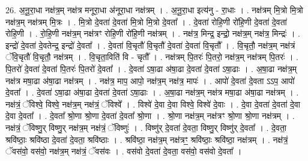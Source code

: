 \documentclass[17pt]{extarticle}
\begin{document}
26. अ॒नू॒रा॒धा नक्ष॑त्र॒म् नक्ष॑त्र मनूरा॒धा अ॑नूरा॒धा नक्ष॑त्रम् । . अ॒नू॒रा॒धा इत्य॑नु - रा॒धाः । . नक्ष॑त्रम् मि॒त्रो मि॒त्रो नक्ष॑त्र॒म् नक्ष॑त्रम् मि॒त्रः । . मि॒त्रो दे॒वता॑ दे॒वता॑ मि॒त्रो मि॒त्रो दे॒वता᳚ । . दे॒वता॑ रोहि॒णी रो॑हि॒णी दे॒वता॑ दे॒वता॑ रोहि॒णी । . रो॒हि॒णी नक्ष॑त्र॒म् नक्ष॑त्रꣳ रोहि॒णी रो॑हि॒णी नक्ष॑त्रम् । . नक्ष॑त्र॒ मिन्द्र॒ इन्द्रो॒ नक्ष॑त्र॒म् नक्ष॑त्र॒ मिन्द्रः॑ । . इन्द्रो॑ दे॒वता॑ दे॒वतेन्द्र॒ इन्द्रो॑ दे॒वता᳚ । . दे॒वता॑ वि॒चृतौ॑ वि॒चृतौ॑ दे॒वता॑ दे॒वता॑ वि॒चृतौ᳚ । . वि॒चृतौ॒ नक्ष॑त्र॒म् नक्ष॑त्रं ॅवि॒चृतौ॑ वि॒चृतौ॒ नक्ष॑त्रम् । . वि॒चृता॒विति॑ वि - चृतौ᳚ । . नक्ष॑त्रम् पि॒तरः॑ पि॒तरो॒ नक्ष॑त्र॒म् नक्ष॑त्रम् पि॒तरः॑ । . पि॒तरो॑ दे॒वता॑ दे॒वता॑ पि॒तरः॑ पि॒तरो॑ दे॒वता᳚ । . दे॒वता॑ ऽषा॒ढा अ॑षा॒ढा दे॒वता॑ दे॒वता॑ ऽषा॒ढाः । . अ॒षा॒ढा नक्ष॑त्र॒म् नक्ष॑त्र मषा॒ढा अ॑षा॒ढा नक्ष॑त्रम् । . नक्ष॑त्र॒ माप॒ आपो॒ नक्ष॑त्र॒म् नक्ष॑त्र॒ मापः॑ । . आपो॑ दे॒वता॑ दे॒वता ऽऽप॒ आपो॑ दे॒वता᳚ । . दे॒वता॑ ऽषा॒ढा अ॑षा॒ढा दे॒वता॑ दे॒वता॑ ऽषा॒ढाः । . अ॒षा॒ढा नक्ष॑त्र॒म् नक्ष॑त्र मषा॒ढा अ॑षा॒ढा नक्ष॑त्रम् । . नक्ष॑त्रं॒ ॅविश्वे॒ विश्वे॒ नक्ष॑त्र॒म् नक्ष॑त्रं॒ ॅविश्वे᳚ । . विश्वे॑ दे॒वा दे॒वा विश्वे॒ विश्वे॑ दे॒वाः । . दे॒वा दे॒वता॑ दे॒वता॑ दे॒वा दे॒वा दे॒वता᳚ । . दे॒वता᳚ श्रो॒णा श्रो॒णा दे॒वता॑ दे॒वता᳚ श्रो॒णा । . श्रो॒णा नक्ष॑त्र॒म् नक्ष॑त्रꣳ श्रो॒णा श्रो॒णा नक्ष॑त्रम् । . नक्ष॑त्रं॒ ॅविष्णु॒र् विष्णु॒र् नक्ष॑त्र॒म् नक्ष॑त्रं॒ ॅविष्णुः॑ । . विष्णु॑र् दे॒वता॑ दे॒वता॒ विष्णु॒र् विष्णु॑र् दे॒वता᳚ । . दे॒वता॒ श्रवि॑ष्ठाः॒ श्रवि॑ष्ठा दे॒वता॑ दे॒वता॒ श्रवि॑ष्ठाः । . श्रवि॑ष्ठा॒ नक्ष॑त्र॒म् नक्ष॑त्रꣳ॒॒ श्रवि॑ष्ठाः॒ श्रवि॑ष्ठा॒ नक्ष॑त्रम् । . नक्ष॑त्रं॒ ॅवस॑वो॒ वस॑वो॒ नक्ष॑त्र॒म् नक्ष॑त्रं॒ ॅवस॑वः । . वस॑वो दे॒वता॑ दे॒वता॒ वस॑वो॒ वस॑वो दे॒वता᳚ । \newline
\end{document}
